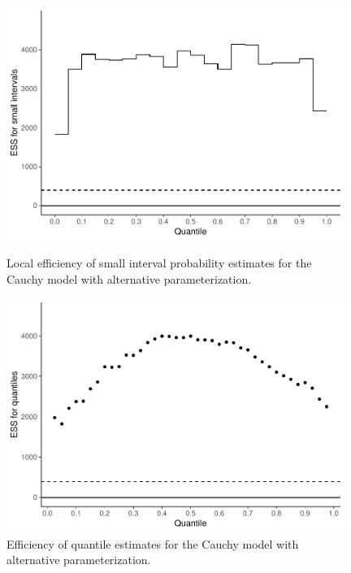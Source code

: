 \documentclass[american,]{article}
\begin{document}
\begin{figure}[tp]
  \centering
  \begin{minipage}{0.48\textwidth}
  \includegraphics[width=0.98\textwidth]{graphics/local-ess-fit-alt1-1.pdf}
  \caption{Local efficiency of small interval probability estimates for the 
  Cauchy model with alternative parameterization.}
\label{fig:local-ess-fit-alt1-1}
\end{minipage}
\hfill
  \begin{minipage}{0.48\textwidth}
  \includegraphics[width=0.98\textwidth]{graphics/quantile-ess-fit-alt1-1.pdf}
  \caption{Efficiency of quantile estimates for the Cauchy model with 
  alternative parameterization.\\~}
  \label{fig:quantile-ess-alt1-1}
\end{minipage}
\end{figure}
\end{document}
